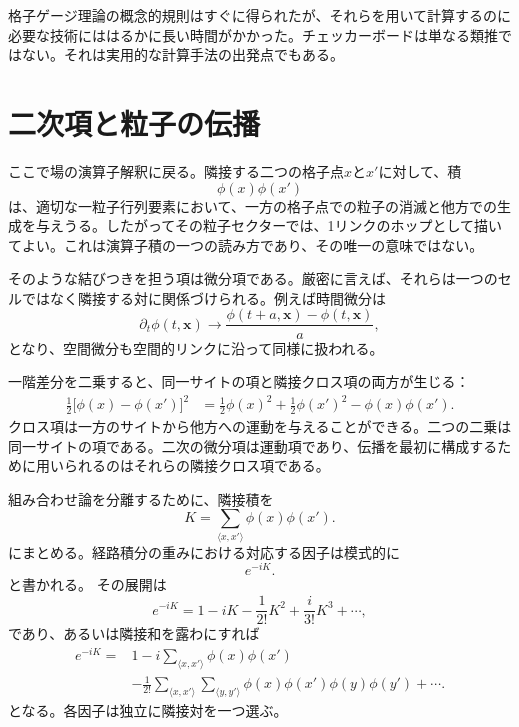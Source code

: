 格子ゲージ理論の概念的規則はすぐに得られたが、それらを用いて計算するのに必要な技術にははるかに長い時間がかかった。チェッカーボードは単なる類推ではない。それは実用的な計算手法の出発点でもある。

\section{二次項と粒子の伝播}

ここで場の演算子解釈に戻る。隣接する二つの格子点\(x\)と\(x'\)に対して、積
\begin{equation}
\phi(x)\phi(x')
\end{equation}
は、適切な一粒子行列要素において、一方の格子点での粒子の消滅と他方での生成を与えうる。したがってその粒子セクターでは、1リンクのホップとして描いてよい。これは演算子積の一つの読み方であり、その唯一の意味ではない。

そのような結びつきを担う項は微分項である。厳密に言えば、それらは一つのセルではなく隣接する対に関係づけられる。例えば時間微分は
\begin{equation}
\partial_t\phi(t,\mathbf{x})
\longrightarrow
\frac{\phi(t+a,\mathbf{x})-\phi(t,\mathbf{x})}{a},
\end{equation}
となり、空間微分も空間的リンクに沿って同様に扱われる。

\begin{classroomqa}
\end{classroomqa}

一階差分を二乗すると、同一サイトの項と隣接クロス項の両方が生じる：
\begin{align}
\frac{1}{2}\bigl[\phi(x)-\phi(x')\bigr]^2
&=
\frac{1}{2}\phi(x)^2
+\frac{1}{2}\phi(x')^2
-\phi(x)\phi(x').
\end{align}
クロス項は一方のサイトから他方への運動を与えることができる。二つの二乗は同一サイトの項である。二次の微分項は運動項であり、伝播を最初に構成するために用いられるのはそれらの隣接クロス項である。

組み合わせ論を分離するために、隣接積を
\begin{equation}
K=\sum_{\langle x,x'\rangle}\phi(x)\phi(x').
\end{equation}
にまとめる。経路積分の重みにおける対応する因子は模式的に
\begin{equation}
e^{-iK}.
\end{equation}
と書かれる。
その展開は
\begin{equation}
e^{-iK}
=1-iK-\frac{1}{2!}K^2+\frac{i}{3!}K^3+\cdots,
\end{equation}
であり、あるいは隣接和を露わにすれば
\begin{align}
e^{-iK}
={}&1
-i\sum_{\langle x,x'\rangle}\phi(x)\phi(x')
\nonumber\\
&-\frac{1}{2!}
\sum_{\langle x,x'\rangle}
\sum_{\langle y,y'\rangle}
\phi(x)\phi(x')\phi(y)\phi(y')
+\cdots .
\end{align}
となる。各因子は独立に隣接対を一つ選ぶ。


